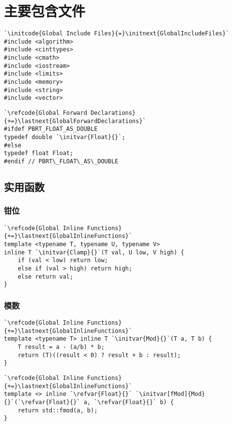 \section{主要包含文件}\label{sec:主要包含文件}
\begin{lstlisting}
`\initcode{Global Include Files}{=}\initnext{GlobalIncludeFiles}`
#include <algorithm>
#include <cinttypes>
#include <cmath>
#include <iostream>
#include <limits>
#include <memory>
#include <string>
#include <vector>
\end{lstlisting}

\begin{lstlisting}
`\refcode{Global Forward Declarations}{+=}\lastnext{GlobalForwardDeclarations}`
#ifdef PBRT_FLOAT_AS_DOUBLE
typedef double `\initvar{Float}{}`;
#else
typedef float Float;
#endif // PBRT\_FLOAT\_AS\_DOUBLE
\end{lstlisting}

\subsection{实用函数}\label{sub:实用函数}
\subsubsection*{钳位}
\begin{lstlisting}
`\refcode{Global Inline Functions}{+=}\lastnext{GlobalInlineFunctions}`
template <typename T, typename U, typename V>
inline T `\initvar{Clamp}{}`(T val, U low, V high) {
    if (val < low) return low;
    else if (val > high) return high;
    else return val;
}
\end{lstlisting}

\subsubsection*{模数}
\begin{lstlisting}
`\refcode{Global Inline Functions}{+=}\lastnext{GlobalInlineFunctions}`
template <typename T> inline T `\initvar{Mod}{}`(T a, T b) {
    T result = a - (a/b) * b;
    return (T)((result < 0) ? result + b : result);
}
\end{lstlisting}
\begin{lstlisting}
`\refcode{Global Inline Functions}{+=}\lastnext{GlobalInlineFunctions}`
template <> inline `\refvar{Float}{}` `\initvar[fMod]{Mod}{}`(`\refvar{Float}{}` a, `\refvar{Float}{}` b) {
    return std::fmod(a, b);
}
\end{lstlisting}

